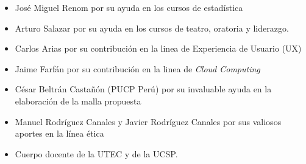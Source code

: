 \begin{itemize}
\item José Miguel Renom por su ayuda en los cursos de estadística
\item Arturo Salazar por su ayuda en los cursos de teatro, oratoria y liderazgo.
\item Carlos Arias por su contribución en la linea de Experiencia de Usuario (UX)
\item Jaime Farfán por su contribución en la linea de \textit{Cloud Computing}
\item César Beltrán Castañón (PUCP Perú) por su invaluable ayuda en la elaboración de la malla propuesta
\item Manuel Rodríguez Canales y Javier Rodríguez Canales por sus valiosos aportes en la línea ética
\item Cuerpo docente de la UTEC y de la UCSP.
\end{itemize}

\begin{comment}
\item Sociedad Peruana de Computación por apoyarnos y facilitarnos su documento de Curricula de Computación.
\item Dr. Ernesto Cuadros-Vargas (Universidad Católica de San Pablo, Arequipa) por su invaluable ayuda en la elaboración de la malla propuesta. 
\item Dr. César Beltrán Castañón (IME - Universidad Católica de San Pablo, Arequipa) por su invaluable ayuda en la elaboración de la malla propuesta. 
\item Julieta Flores y Johan Chicana Díaz por facilitarnos la base de sus estudios de mercado, recolección de datos y tabulación de resultados.
\item Dr. Glen Rodriguez (Universidad Nacional de Ingeniería ) por su ayuda en la elaboración de la línea de Computación Distribuída.
\item Dr. José Luis Segovia (CONCYTEC y Universidad Peruana Cayetano Heredia) por su ayuda en la elaboración de la línea de Interacción Humano-Computador.
\item Dr. Jes\'us Castagnetto (Universidad Peruana Cayetano Heredia) por ayudarnos en la elaboración de la línea de Computación Distribuida y Bio-informática.
\item Dr. Mirko Zimic (Universidad Peruana Cayetano Heredia) por ayudarnos en la elaboración de la línea de Bioinformática.
\item Dr. Bruno Schulze (Laboratorio Nacional de Computa\c{c}\~ao Científica, Brasil) por su apoyo en la línea de investigación de aplicación de computación distribuida a la bio-informática.
\item Mg. Robinson Oliva (Universidad Nacional de Ingeniería ) por su ayuda en la elaboración de los cursos relacionados con Arquitectura y Organización
\item Dr. A. M. Coronado (Universidad Nacional de Ingeniería ) por su apoyo en la línea de investigación de Ciencia Computacional y Métodos Numéricos.
\end{comment}

